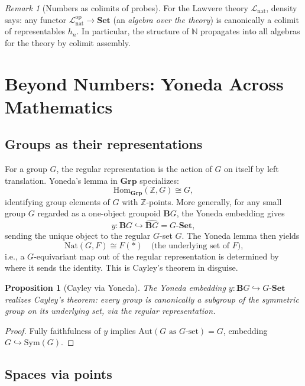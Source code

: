 \documentclass[12pt]{article}
\newtheorem{proposition}[theorem]{Proposition}
\theoremstyle{definition}
\theoremstyle{remark}
\newtheorem{remark}[theorem]{Remark}
\begin{document}
\begin{remark}[Numbers as colimits of probes]
\label{rem:colim-of-probes}
For the Lawvere theory $\mathcal{L}_{\mathrm{nat}}$, density says: any functor $\mathcal{L}_{\mathrm{nat}}^{\mathrm{op}} \to \mathbf{Set}$ (an \emph{algebra over the theory}) is canonically a colimit of representables $h_n$. In particular, the structure of $\mathbb{N}$ propagates into all algebras for the theory by colimit assembly.
\end{remark}

\section{Beyond Numbers: Yoneda Across Mathematics}
\label{sec:beyond-numbers}

\subsection{Groups as their representations}

For a group $G$, the regular representation is the action of $G$ on itself by left translation. Yoneda's lemma in $\mathbf{Grp}$ specializes:
\[
\mathrm{Hom}_{\mathbf{Grp}}(\mathbb{Z}, G) \cong G,
\]
identifying group elements of $G$ with $\mathbb{Z}$-points. More generally, for any small group $G$ regarded as a one-object groupoid $\mathbf{B}G$, the Yoneda embedding gives
\[
y\colon \mathbf{B}G \hookrightarrow \widehat{\mathbf{B}G} = G\text{-}\mathbf{Set},
\]
sending the unique object to the regular $G$-set $G$. The Yoneda lemma then yields
\[
\mathrm{Nat}(G, F) \cong F(*) \quad \text{(the underlying set of $F$),}
\]
i.e., a $G$-equivariant map out of the regular representation is determined by where it sends the identity. This is Cayley's theorem in disguise.

\begin{proposition}[Cayley via Yoneda]
\label{prop:cayley-yoneda}
The Yoneda embedding $y\colon \mathbf{B}G \hookrightarrow G\text{-}\mathbf{Set}$ realizes Cayley's theorem: every group is canonically a subgroup of the symmetric group on its underlying set, via the regular representation.
\end{proposition}

\begin{proof}
Fully faithfulness of $y$ implies $\mathrm{Aut}(G \text{ as $G$-set}) = G$, embedding $G \hookrightarrow \mathrm{Sym}(G)$.
\end{proof}

\subsection{Spaces via points}
\end{document}
